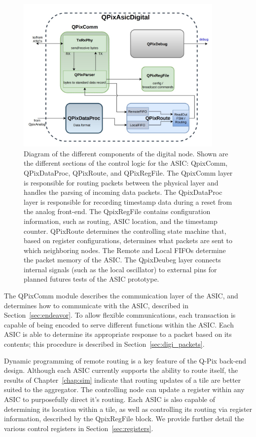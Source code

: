 \begin{figure}[]
\centering
\includegraphics[width=0.9\textwidth]{images/digital_node_overview.jpg}
\caption{Diagram of the different components of the digital node.
  Shown are the different sections of the control logic for the ASIC: QpixComm, QPixDataProc, QPixRoute, and QPixRegFile.
  The QpixComm layer is responsible for routing packets between the physical layer and handles the parsing of incoming data packets.
  The QpixDataProc layer is responsible for recording timestamp data during a reset from the analog front-end.
  The QpixRegFile contains configuration information, such as routing, ASIC location, and the timestamp counter.
  QPixRoute determines the controlling state machine that, based on register configurations, determines what packets are sent to which neighboring nodes.
  The Remote and Local FIFOs determine the packet memory of the ASIC. 
  The QpixDeubeg layer connects internal signals (such as the local oscillator) to external pins for planned futures tests of the ASIC prototype.
  }
\label{fig:qpa_diagram}
\end{figure}

The QPixComm module describes the communication layer of the ASIC, and determines how to communicate with the ASIC, described in Section~\ref{sec:endeavor}.
To allow flexible communications, each transaction is capable of being encoded to serve different functions within the ASIC.
Each ASIC is able to determine its appropriate response to a packet based on its contents; this procedure is described in Section~\ref{sec:digi_packets}.

Dynamic programming of remote routing is a key feature of the Q-Pix back-end design.
Although each ASIC currently supports the ability to route itself, the results of Chapter~\ref{chap:sim} indicate that routing updates of a tile are better suited to the aggregator.
The controlling node can update a register within any ASIC to purposefully direct it's routing.
Each ASIC is also capable of determining its location within a tile, as well as controlling its routing via register information, described by the QpixRegFile block.
We provide further detail the various control registers in Section~\ref{sec:registers}.

